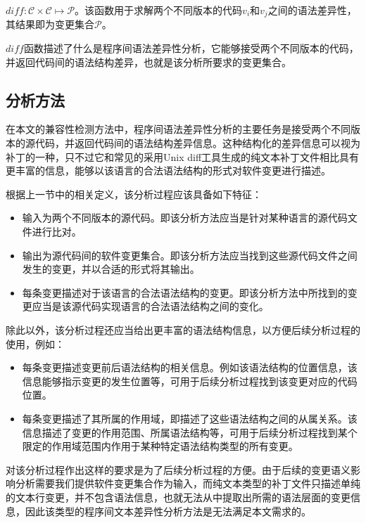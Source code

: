 \begin{definition}
	\label {define_diff}
	$diff : \mathcal{C} \times \mathcal{C} \mapsto \mathcal{P}$。该函数用于求解两个不同版本的代码$v_i$和$v_j$之间的语法差异性，其结果即为变更集合$\mathcal{P}$。
\end{definition}

$diff$函数描述了什么是程序间语法差异性分析，它能够接受两个不同版本的代码，并返回代码间的语法结构差异，也就是该分析所要求的变更集合。

\subsection{分析方法}

在本文的兼容性检测方法中，程序间语法差异性分析的主要任务是接受两个不同版本的源代码，并返回代码间的语法结构差异信息。这种结构化的差异信息可以视为补丁的一种，只不过它和常见的采用Unix diff工具生成的纯文本补丁文件相比具有更丰富的信息，能够以该语言的合法语法结构的形式对软件变更进行描述。

根据上一节中的相关定义，该分析过程应该具备如下特征：
\begin{itemize}
	\item 输入为两个不同版本的源代码。即该分析方法应当是针对某种语言的源代码文件进行比对。
	\item 输出为源代码间的软件变更集合。即该分析方法应当找到这些源代码文件之间发生的变更，并以合适的形式将其输出。
	\item 每条变更描述对于该语言的合法语法结构的变更。即该分析方法中所找到的变更应当是该源代码实现语言的合法语法结构之间的变化。
\end{itemize}

除此以外，该分析过程还应当给出更丰富的语法结构信息，以方便后续分析过程的使用，例如：
\begin{itemize}
	\item 每条变更描述变更前后语法结构的相关信息。例如该语法结构的位置信息，该信息能够指示变更的发生位置等，可用于后续分析过程找到该变更对应的代码位置。
	\item 每条变更描述了其所属的作用域，即描述了这些语法结构之间的从属关系。该信息描述了变更的作用范围、所属语法结构等，可用于后续分析过程找到某个限定的作用域范围内作用于某种特定语法结构类型的所有变更。
\end{itemize}

对该分析过程作出这样的要求是为了后续分析过程的方便。由于后续的变更语义影响分析需要我们提供软件变更集合作为输入，而纯文本类型的补丁文件只描述单纯的文本行变更，并不包含语法信息，也就无法从中提取出所需的语法层面的变更信息，因此该类型的程序间文本差异性分析方法是无法满足本文需求的。

